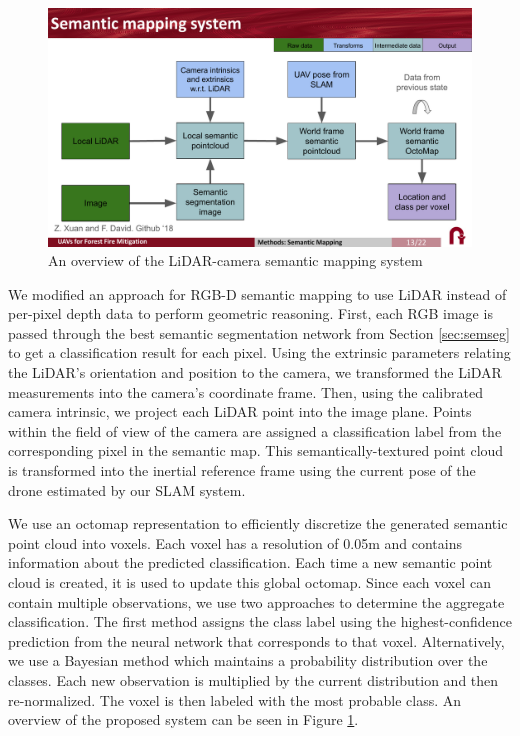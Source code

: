 \begin{figure}[!ht]
    \centering
    \includegraphics[width=\textwidth, clip, trim={0 1.5cm 0 1.8cm}]{figs/methods/semantic_mapping/semantic_mapping_overview.pdf}
    \caption{An overview of the LiDAR-camera semantic mapping system}
    \label{fig:methods:lidar-camera-semantic-mapping}
\end{figure}

We modified an approach for RGB-D semantic mapping \cite{semantic_slam} to use LiDAR instead of per-pixel depth data to perform geometric reasoning. First, each RGB image is passed through the best semantic segmentation network from Section \ref{sec:semseg} to get a classification result for each pixel. Using the extrinsic parameters relating the LiDAR's orientation and position to the camera, we transformed the LiDAR measurements into the camera's coordinate frame. Then, using the calibrated camera intrinsic, we project each LiDAR point into the image plane. Points within the field of view of the camera are assigned a classification label from the corresponding pixel in the semantic map. This semantically-textured point cloud is transformed into the inertial reference frame using the current pose of the drone estimated by our SLAM system. 

We use an octomap \cite{hornung13auro} representation to efficiently discretize the generated semantic point cloud into voxels. Each voxel has a resolution of 0.05m and contains information about the predicted classification. Each time a new semantic point cloud is created, it is used to update this global octomap. Since each voxel can contain multiple observations, we use two approaches to determine the aggregate classification. The first method assigns the class label using the highest-confidence prediction from the neural network that corresponds to that voxel. Alternatively, we use a Bayesian method which maintains a probability distribution over the classes. Each new observation is multiplied by the current distribution and then re-normalized. The voxel is then labeled with the most probable class. An overview of the proposed system can be seen in Figure \ref{fig:methods:lidar-camera-semantic-mapping}.


